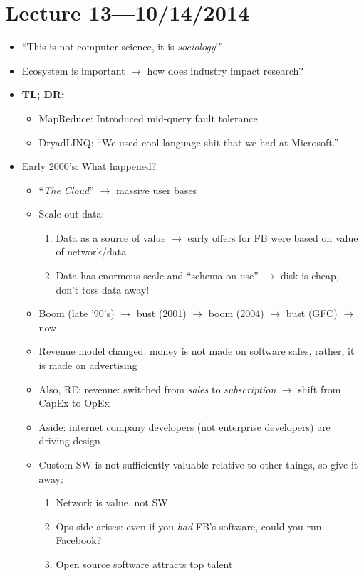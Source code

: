 \documentclass[10pt]{article}
\begin{document}
\section{Lecture 13---10/14/2014}

\begin{itemize}
\item ``This is not computer science, it is \emph{sociology}!''
\item Ecosystem is important $\rightarrow$ how does industry impact research?
\item \textbf{TL; DR:}
\begin{itemize}
\item MapReduce: Introduced mid-query fault tolerance
\item DryadLINQ: ``We used cool language shit that we had at Microsoft.''
\end{itemize}
\item Early 2000's: What happened?
\begin{itemize}
\item ``\emph{The Cloud}'' $\rightarrow$ massive user bases
\item Scale-out data:
\begin{enumerate}
\item Data as a source of value $\rightarrow$ early offers for FB were based on value of network/data
\item Data has enormous scale and ``schema-on-use'' $\rightarrow$ disk is cheap, don't toss data away!
\end{enumerate}
\item Boom (late '90's) $\rightarrow$ bust (2001) $\rightarrow$ boom (2004) $\rightarrow$ bust (GFC)
$\rightarrow$ now
\item Revenue model changed: money is not made on software sales, rather, it is made on advertising
\item Also, RE: revenue: switched from \emph{sales} to \emph{subscription} $\rightarrow$ shift from
CapEx to OpEx
\item Aside: internet company developers (not enterprise developers) are driving design
\item Custom SW is not sufficiently valuable relative to other things, so give it away:
\begin{enumerate}
\item Network is value, not SW
\item Ops side arises: even if you \emph{had} FB's software, could you run Facebook?
\item Open source software attracts top talent

\end{enumerate}
\end{itemize}
\end{itemize}
\end{document}
